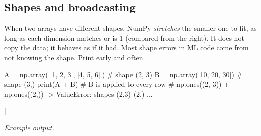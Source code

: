 \subsection{Shapes and broadcasting}

\begin{boss}[: broadcasting]
When two arrays have different shapes, NumPy \emph{stretches} the smaller one to fit, as long as
each dimension matches or is 1 (compared from the right). It does not copy the data; it
behaves as if it had. Most shape errors in ML code come from not knowing the shape. Print
 early and often.

\begin{center}
\end{center}

\begin{pycode}
A = np.array([[1, 2, 3], [4, 5, 6]])    # shape (2, 3)
B = np.array([10, 20, 30])              # shape (3,)
print(A + B)                            # B is applied to every row
# np.ones((2, 3)) + np.ones((2,))  -> ValueError: shapes (2,3) (2,) ...
\end{pycode}
\begin{rawcode}
[[11 22 33]
 [14 25 36]]
\end{rawcode}
\noindent\textit{Example output.}
\end{boss}

